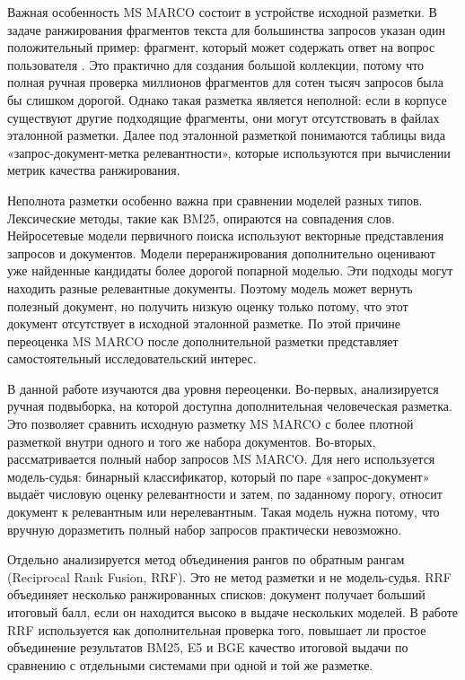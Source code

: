 \documentclass[10pt,a4paper,twocolumn]{article}
\begin{document}
Важная особенность MS MARCO состоит в устройстве исходной разметки. В задаче ранжирования фрагментов текста для большинства запросов указан один положительный пример: фрагмент, который может содержать ответ на вопрос пользователя \cite{msmarco_datasets}. Это практично для создания большой коллекции, потому что полная ручная проверка миллионов фрагментов для сотен тысяч запросов была бы слишком дорогой. Однако такая разметка является неполной: если в корпусе существуют другие подходящие фрагменты, они могут отсутствовать в файлах эталонной разметки. Далее под эталонной разметкой понимаются таблицы вида «запрос-документ-метка релевантности», которые используются при вычислении метрик качества ранжирования.

Неполнота разметки особенно важна при сравнении моделей разных типов. Лексические методы, такие как BM25, опираются на совпадения слов. Нейросетевые модели первичного поиска используют векторные представления запросов и документов. Модели переранжирования дополнительно оценивают уже найденные кандидаты более дорогой попарной моделью. Эти подходы могут находить разные релевантные документы. Поэтому модель может вернуть полезный документ, но получить низкую оценку только потому, что этот документ отсутствует в исходной эталонной разметке. По этой причине переоценка MS MARCO после дополнительной разметки представляет самостоятельный исследовательский интерес.

В данной работе изучаются два уровня переоценки. Во-первых, анализируется ручная подвыборка, на которой доступна дополнительная человеческая разметка. Это позволяет сравнить исходную разметку MS MARCO с более плотной разметкой внутри одного и того же набора документов. Во-вторых, рассматривается полный набор запросов MS MARCO. Для него используется модель-судья: бинарный классификатор, который по паре «запрос-документ» выдаёт числовую оценку релевантности и затем, по заданному порогу, относит документ к релевантным или нерелевантным. Такая модель нужна потому, что вручную доразметить полный набор запросов практически невозможно.

Отдельно анализируется метод объединения рангов по обратным рангам (Reciprocal Rank Fusion, RRF). Это не метод разметки и не модель-судья. RRF объединяет несколько ранжированных списков: документ получает больший итоговый балл, если он находится высоко в выдаче нескольких моделей. В работе RRF используется как дополнительная проверка того, повышает ли простое объединение результатов BM25, E5 и BGE качество итоговой выдачи по сравнению с отдельными системами при одной и той же разметке.
\end{document}
